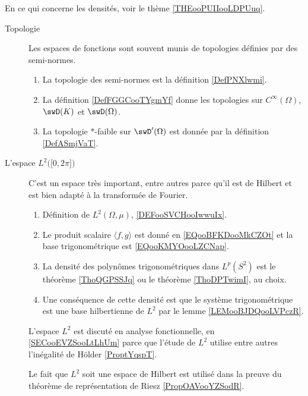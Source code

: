                 \label{THEMooNMYKooVVeGTU}

En ce qui concerne les densités, voir le thème \ref{THEooPUIIooLDPUuq}.


\begin{description}
    \item[Topologie]

        Les espaces de fonctions sont souvent munis de topologies définies par des semi-normes.

        \begin{enumerate}
            \item
                La topologie des semi-normes est la définition \ref{DefPNXlwmi}.
            \item
                La définition \ref{DefFGGCooTYgmYf} donne les topologies sur \(  C^{\infty}(\Omega)\), \( \swD(K)\) et \( \swD(\Omega)\).
            \item
                La topologie \( *\)-faible sur \( \swD'(\Omega)\) est donnée par la définition \ref{DefASmjVaT}.
        \end{enumerate}

    \item[L'espace \( { L^2\big( \mathopen[ 0 , 2\pi \mathclose] \big) } \)]

        C'est un espace très important, entre autres parce qu'il est de Hilbert et est bien adapté à la transformée de Fourier.

        \begin{enumerate}
        \item
            Définition de \( L^2(\Omega,\mu)\), \ref{DEFooSVCHooIwwuIx}.
            \item
                Le produit scalaire \( \langle f, g\rangle \) est donné en \eqref{EQooBFKDooMkCZOt} et la base trigonométrique est \eqref{EQooKMYOooLZCNap}.
            \item 
                La densité des polynômes trigonométriques dans \( L^p(S^2)\) est le théorème \ref{ThoQGPSSJq} ou le théorème \ref{ThoDPTwimI}, au choix.
            \item
                Une conséquence de cette densité est que le système trigonométrique est une base hilbertienne de \( L^2\) par le lemme \ref{LEMooBJDQooLVPczR}.
        \end{enumerate}

            L'espace \( L^2\)  est discuté en analyse fonctionnelle, en \ref{SECooEVZSooLtLhUm} parce que l'étude de \( L^2\) utilise entre autres l'inégalité de Hölder \ref{ProptYqspT}.

        Le fait que \( L^2\) soit une espace de Hilbert est utilisé dans la preuve du théorème de représentation de Riesz \ref{PropOAVooYZSodR}.

\end{description}
